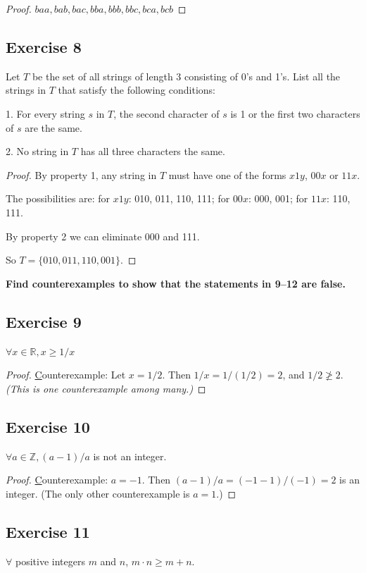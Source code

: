 \documentclass[14pt]{extarticle}
\newcommand{\R}{\mathbb{R}}
\newcommand{\Z}{\mathbb{Z}}
\newcommand{\fa}{\forall}
\begin{document}
\begin{proof}
$baa, bab, bac, bba, bbb, bbc, bca, bcb$
\end{proof}

\subsection{Exercise 8}
Let $T$ be the set of all strings of length 3 consisting of 0’s and 1’s. List all the strings in $T$ that satisfy the following conditions:

1. For every string $s$ in $T$, the second character of $s$ is 1 or the first two characters of $s$ are the same.

2. No string in $T$ has all three characters the same.

\begin{proof}
By property 1, any string in $T$ must have one of the forms $x1y$, $00x$ or $11x$.

The possibilities are: for $x1y$: 010, 011, 110, 111; for $00x$: 000, 001; for $11x$: 110, 111.

By property 2 we can eliminate 000 and 111.

So $T = \{010, 011, 110, 001\}$.
\end{proof}

{\bf \color{cyan} Find counterexamples to show that the statements in 9–12 are false.}

\subsection{Exercise 9}
$\fa x \in \R, x \geq 1/x$

\begin{proof}
{\underline Counterexample}: Let $x = 1/2$. Then $1/x = 1/(1/2) = 2$, and $1/2 \ngeq 2$. {\it (This is one counterexample among many.)}
\end{proof}

\subsection{Exercise 10}
$\fa a \in \Z, (a-1)/a$ is not an integer.

\begin{proof}
{\underline Counterexample}: $a = -1$. Then $(a-1)/a = (-1-1)/(-1) = 2$ is an integer. (The only other counterexample is $a = 1$.)
\end{proof}

\subsection{Exercise 11}
$\fa$ positive integers $m$ and $n$, $m \cdot n \geq m + n$.
\end{document}
